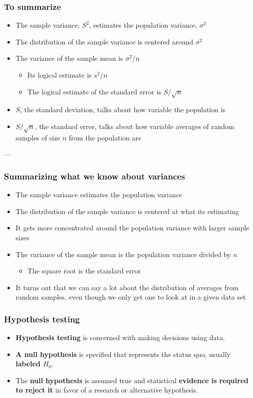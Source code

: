 \documentclass[10pt,article]{article}
\begin{document}
\subsubsection{To summarize}
\label{sec:orgcca2283}
\begin{itemize}
\item The sample variance, \(S^2\), estimates the population variance, \(\sigma^2\)
\item The distribution of the sample variance is centered around \(\sigma^2\)
\item The variance of the sample mean is \(\sigma^2 / n\)
\begin{itemize}
\item Its logical estimate is \(s^2 / n\)
\item The logical estimate of the standard error is \(S / \sqrt{n}\)
\end{itemize}
\item \(S\), the standard deviation, talks about how variable the population is
\item \(S/\sqrt{n}\), the standard error, talks about how variable averages of random samples of size \(n\) from the population are
\end{itemize}

---
\subsubsection{Summarizing what we know about variances}
\label{sec:org0a659bb}
\begin{itemize}
\item The sample variance estimates the population variance
\item The distribution of the sample variance is centered at what its estimating
\item It gets more concentrated around the population variance with larger sample sizes
\item The variance of the sample mean is the population variance divided by \(n\)
\begin{itemize}
\item The square root is the standard error
\end{itemize}
\item It turns out that we can say a lot about the distribution of averages from random samples, even though we only get one to look at in a given data set
\end{itemize}

\subsubsection{Hypothesis testing}
\label{sec:orgcac8263}
\begin{itemize}
\item \textbf{Hypothesis testing} is concerned with {\color{green}making decisions using data}.
\item \textbf{A null hypothesis} is specified that {\color{green}represents the status quo},
usually \textbf{labeled \(H_0\)}.
\item The \textbf{null hypothesis} is {\color{green}assumed true} and statistical \textbf{evidence is required
to reject it} in favor of a research or alternative hypothesis.
\end{itemize}
\end{document}
